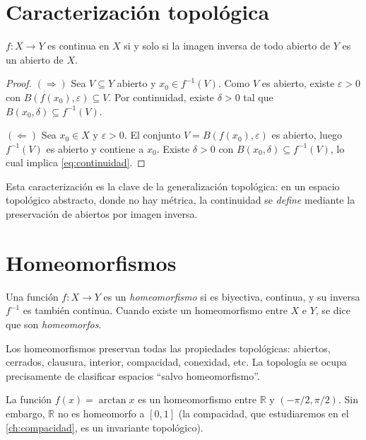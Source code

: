 \section{Caracterización topológica}

\begin{theorem}
\label{teo:continuidad-topologica}
$f\colon X\to Y$ es continua en $X$ si y solo si la imagen inversa de todo abierto de $Y$ es un abierto de $X$.
\end{theorem}
\begin{proof}
$(\Rightarrow)$ Sea $V\subseteq Y$ abierto y $x_0\in f^{-1}(V)$. Como $V$ es abierto, existe $\varepsilon>0$ con $B(f(x_0),\varepsilon)\subseteq V$. Por continuidad, existe $\delta>0$ tal que $B(x_0,\delta)\subseteq f^{-1}(V)$.

$(\Leftarrow)$ Sea $x_0\in X$ y $\varepsilon>0$. El conjunto $V=B(f(x_0),\varepsilon)$ es abierto, luego $f^{-1}(V)$ es abierto y contiene a $x_0$. Existe $\delta>0$ con $B(x_0,\delta)\subseteq f^{-1}(V)$, lo cual implica \eqref{eq:continuidad}.
\end{proof}

Esta caracterización es la clave de la generalización topológica: en un espacio topológico abstracto, donde no hay métrica, la continuidad se \emph{define} mediante la preservación de abiertos por imagen inversa.

\section{Homeomorfismos}

\begin{definition}
\label{def:homeomorfismo}
Una función $f\colon X\to Y$ es un \emph{homeomorfismo} si es biyectiva, continua, y su inversa $f^{-1}$ es también continua. Cuando existe un homeomorfismo entre $X$ e $Y$, se dice que son \emph{homeomorfos}.
\end{definition}

Los homeomorfismos preservan todas las propiedades topológicas: abiertos, cerrados, clausura, interior, compacidad, conexidad, etc. La topología se ocupa precisamente de clasificar espacios ``salvo homeomorfismo''.

\begin{example}
\label{ej:homeomorfismo-r}
La función $f(x)=\arctan x$ es un homeomorfismo entre $\mathbb{R}$ y $(-\pi/2,\pi/2)$. Sin embargo, $\mathbb{R}$ no es homeomorfo a $[0,1]$ (la compacidad, que estudiaremos en el \cref{ch:compacidad}, es un invariante topológico).
\end{example}

